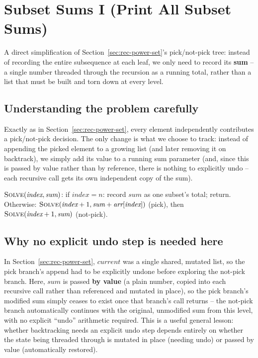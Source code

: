 \section{Subset Sums I (Print All Subset Sums)}
\label{sec:rec-subset-sum-1}


\begin{patternbox}
A direct simplification of Section~\ref{sec:rec-power-set}'s
pick/not-pick tree: instead of recording the entire subsequence at each
leaf, we only need to record its \textbf{sum} -- a single number threaded
through the recursion as a running total, rather than a list that must
be built and torn down at every level.
\end{patternbox}

\subsection*{Understanding the problem carefully}

Exactly as in Section~\ref{sec:rec-power-set}, every element independently
contributes a pick/not-pick decision. The only change is what we choose
to track: instead of appending the picked element to a growing list (and
later removing it on backtrack), we simply add its value to a running
sum parameter (and, since this is passed by value rather than by
reference, there is nothing to explicitly undo -- each recursive call
gets its own independent copy of the sum).

\begin{ideabox}
$\textsc{Solve}(\textit{index}, \textit{sum})$: if
$\textit{index} = n$: record $\textit{sum}$ as one subset's total;
return. Otherwise: $\textsc{Solve}(\textit{index}+1, \textit{sum} +
\textit{arr}[\textit{index}])$ (pick), then
$\textsc{Solve}(\textit{index}+1, \textit{sum})$ (not-pick).
\end{ideabox}

\subsection*{Why no explicit undo step is needed here}

In Section~\ref{sec:rec-power-set}, $\textit{current}$ was a single
shared, mutated list, so the pick branch's append had to be explicitly
undone before exploring the not-pick branch. Here, $\textit{sum}$ is
passed \textbf{by value} (a plain number, copied into each recursive
call rather than referenced and mutated in place), so the pick branch's
modified sum simply ceases to exist once that branch's call returns --
the not-pick branch automatically continues with the original,
unmodified sum from this level, with no explicit ``undo'' arithmetic
required. This is a useful general lesson: whether backtracking needs an
explicit undo step depends entirely on whether the state being threaded
through is mutated in place (needing undo) or passed by value
(automatically restored).

